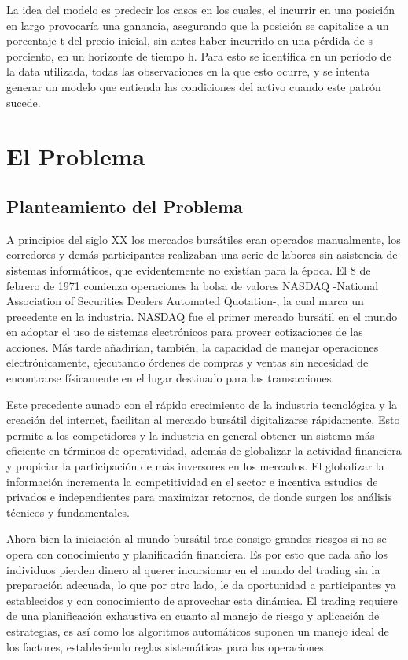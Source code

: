 \documentclass[a4paper,12pt]{Latex/Classes/PhDthesisPSnPDF}
\begin{document}
La idea del modelo es predecir los casos en los cuales, el incurrir en una posición en largo provocaría una ganancia, asegurando que la posición se capitalice a un porcentaje t del precio inicial, sin antes haber incurrido en una pérdida de s porciento, en un horizonte de tiempo h. Para esto se identifica en un período de la data utilizada, todas las observaciones en la que esto ocurre, y se intenta generar un modelo que entienda las condiciones del activo cuando este patrón sucede.


\chapter{El Problema}

\section{Planteamiento del Problema}

A principios del siglo XX los mercados bursátiles eran operados manualmente, los corredores y demás participantes realizaban una serie de labores sin asistencia de sistemas informáticos, que evidentemente no existían para la época. El 8 de febrero de 1971 comienza operaciones la bolsa de valores NASDAQ -National Association of Securities Dealers Automated Quotation-, la cual marca un precedente en la industria. NASDAQ fue el primer mercado bursátil en el mundo en adoptar el uso de sistemas electrónicos para proveer cotizaciones de las acciones. Más tarde añadirían, también, la capacidad de manejar operaciones electrónicamente, ejecutando órdenes de compras y ventas sin necesidad de encontrarse físicamente en el lugar destinado para las transacciones.

Este precedente aunado con el rápido crecimiento de la industria tecnológica y la creación del internet, facilitan al mercado bursátil digitalizarse rápidamente. Esto permite a los competidores y la industria en general obtener un sistema más eficiente en términos de operatividad, además de globalizar la actividad financiera y propiciar la participación de más inversores en los mercados. El globalizar la información incrementa la competitividad en el sector e incentiva estudios de privados e independientes para maximizar retornos, de donde surgen los análisis técnicos y fundamentales.

Ahora bien la iniciación al mundo bursátil trae consigo grandes riesgos si no se opera con conocimiento y planificación financiera. Es por esto que cada año los individuos pierden dinero al querer incursionar en el mundo del trading sin la preparación adecuada, lo que por otro lado, le da oportunidad a participantes ya establecidos y con conocimiento de aprovechar esta dinámica. El trading requiere de una planificación exhaustiva en cuanto al manejo de riesgo y aplicación de estrategias, es así como los algoritmos automáticos suponen un manejo ideal de los factores, estableciendo reglas sistemáticas para las operaciones.
\end{document}
